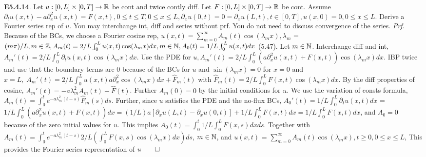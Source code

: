 {\bf E5.4.14}. Let $u: [0,L] \times [0,T] \rightarrow \mathbb{R}$ be cont and twice contly diff. Let $F: [0,L] \times [0,T] \rightarrow \mathbb{R}$ be cont.  Assume $\partial_t u(x,t) - a \partial_x^2 u(x,t) = F(x,t), 0 \leq t \leq T, 0 \leq x \leq L, \partial_x u(0,t) = 0 = \partial_x u(L,t), t \in [0, T], u(x,0)=0, 0 \leq x \leq L$. Derive a Fourier series rep of $u$.  You may interchange int, diff and series without prf.  You do not need to discuss convergence of the series. {\it Prf}. Because of the BCs, we choose a Fourier cosine rep, $u(x,t)=\sum_{m=0}^{\infty}A_m(t) \cos(\lambda_m x), \lambda_m$ = $(m \pi)/L, m \in \mathbb{Z}, A_m(t) = 2/L \int_0^L u(x,t) \cos(\lambda_m x) dx, m \in \mathbb{N}, A_0(t)= 1/L \int_0^L u(x,t) dx$ (5.47). Let $m \in \mathbb{N}$. Interchange diff and int, $A_m'(t) = 2/L \int_0^L \partial_t u(x,t) \cos(\lambda_m x) dx$. Use the PDE for $u, A_m'(t) = 2/L \int_0^L (a \partial_x^2 u(x,t) + F(x,t))\cos(\lambda_m x) dx$.  IBP twice and use that the boundary terms are 0 because of the BCs for $u$ and $\sin(\lambda_m x) = 0$ for $x = 0$ and $x = L,\; A_m'(t) = 2/L \int_0^L u(x,t) a \partial_x^2 \cos(\lambda_m x) dx + \hat{F}_m (t)$ with $\hat{F}_m (t)= 2/L \int_0^L F(x,t)\cos(\lambda_m x) dx$. By the diff properties of cosine, $A_m'(t) = -a \lambda_m^2 A_m(t) + \hat{F}(t)$. Further $A_m(0)=0$ by the initial conditions for $u$. We use the variation of consts formula, $A_m(t) = \int_0^t e^{-a \lambda_m^2 (t-s)}\hat{F}_m(s) ds$. Further, since $u$ satisfies the PDE and the no-flux BCs, $A_0'(t) = 1/L \int_0^L \partial_t u(x,t)dx$ = $1/L \int_0^L (a \partial_x^2 u(x,t)+ F(x,t))dx = (1/L)a [ \partial_x u(L,t)-\partial_x u(0,t)]+1/L\int_0^L F(x,t)dx = 1/L \int_0^L F(x,t)dx$, and $A_0 = 0$ because of the zero initial values for $u$. This implies $A_0(t)=\int_0^t 1/L \int_0^L F(x,s)dxds$.  Together with $A_m(t) = \int_0^t e^{-a \lambda_m^2 (t-s)}2/L ( \int_0^L F(x,s) \cos (\lambda_m x)dx)ds$, $m \in \mathbb{N}$, and $u(x,t)$ = $\sum_{m=0}^{\infty} A_m (t) \cos(\lambda_m x), t \geq 0, 0 \leq x \leq L$, This provides the Fourier series representation of $u \qed$